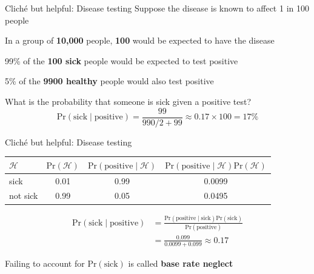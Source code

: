 \documentclass[12pt,aspectratio=169]{beamer}
\newcommand{\prob}{\text{Pr}}
\begin{document}
\begin{frame}{Cliché but helpful: Disease testing}
    Suppose the disease is known to affect 1 in 100 people
    \pause\newline

    In a group of \textbf{10,000} people, \textbf{100} would be expected to have the disease
    \pause

    99\% of the \textbf{100 sick} people would be expected to test positive
    \pause

    5\% of the \textbf{9900 healthy} people would also test positive
    \pause\newline

    What is the probability that someone is sick given a positive test?
    \pause
    $$
    \prob(\text{sick} \mid \text{positive}) = \frac{99}{990/2 + 99} \approx 0.17 \times 100 = 17\%
    $$
    
\end{frame}

\begin{frame}{Cliché but helpful: Disease testing}
    \begin{table}[]
        \centering
        \begin{tabular}{l|c|c|c}
             \toprule
             $\mathcal{H}$ & $\prob(\mathcal{H})$ & $\prob(\text{positive} \mid \mathcal{H})$ & $\prob(\text{positive}\mid
             \mathcal{H})\prob(\mathcal{H})$ \\
             \midrule
             sick & 0.01 & 0.99 & 0.0099  \\
             not sick & 0.99 & 0.05 & 0.0495 \\
             \bottomrule
        \end{tabular}
    \end{table}

    \begin{align*}
    \prob(\text{sick} \mid \text{positive}) &= \frac{\prob(\text{positive} \mid \text{sick})\prob(\text{sick})}{\prob(\text{positive})} \\
    &= \frac{0.099}{0.0099 + 0.099} \approx 0.17
    \end{align*}
    \pause

    Failing to account for $\prob(\text{sick})$ is called \textbf{base rate neglect}
\end{frame}
\end{document}
